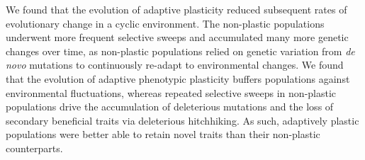 We found that the evolution of adaptive plasticity reduced subsequent rates of evolutionary change in a cyclic environment.
The non-plastic populations underwent more frequent selective sweeps and accumulated many more genetic changes over time, as non-plastic populations relied on genetic variation from \textit{de novo} mutations to continuously re-adapt to environmental changes. 
We found that the evolution of adaptive phenotypic plasticity buffers populations against environmental fluctuations, whereas repeated selective sweeps in non-plastic populations drive the accumulation of deleterious mutations and the loss of secondary beneficial traits via deleterious hitchhiking.
As such, adaptively plastic populations were better able to retain novel traits than their non-plastic counterparts.
